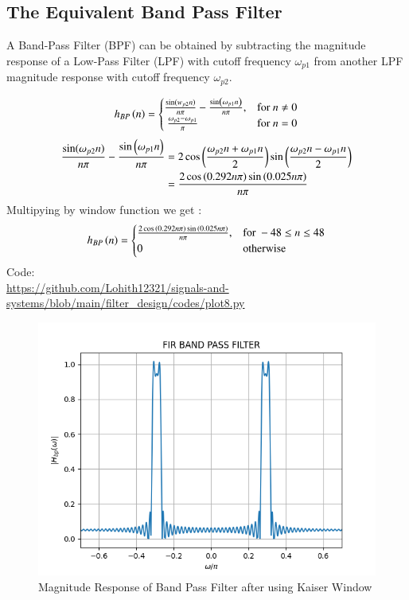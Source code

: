 \documentclass{article}
\begin{document}
\subsection{The Equivalent Band Pass Filter}
A Band-Pass Filter (BPF) can be obtained by subtracting the magnitude response of a Low-Pass Filter (LPF) with cutoff frequency $\omega_{p1}$ from another LPF magnitude response with cutoff frequency $\omega_{p2}$.

\begin{align}
    h_{BP}\left(n\right) = 
\begin{cases} 
    \frac{\sin(w_{p2} n)}{n\pi} -\frac{\sin\left(\omega_{p1}n\right)}{n\pi},  & \text{for } n\neq 0\\\
    \frac{\omega_{p2}-\omega_{p1}}{\pi} &\text{for } n= 0
\end{cases} \label{eq:h(n)desired_for_LPF}
\end{align}
\begin{align}
     \frac{\sin(\omega_{p2} n)}{n\pi} -\frac{\sin\left(\omega_{p1}n\right)}{n\pi} &= 2\cos{\ensuremath{\left(\frac{\omega_{p2}n+\omega_{p1}n}{2}\right)}}\sin{\ensuremath{\left(\frac{\omega_{p2}n-\omega_{p1}n}{2}\right)}}\\
            &= \frac{2\cos{\ensuremath{\left(0.292n\pi\right)}}\sin{\ensuremath{\left(0.025n\pi\right)}}}{n\pi}
\end{align}
Multipying by window function we get :
\begin{align}
    h_{BP}\left(n\right) = 
\begin{cases} 
   \frac{2\cos{\ensuremath{\left(0.292n\pi\right)}}\sin{\ensuremath{\left(0.025n\pi\right)}}}{n\pi},  & \text{for } -48\leq n \leq 48 \\
    0 &\text{otherwise}
\end{cases} \label{eq:h_BP(n)desired_for_LPF}
\end{align}
Code:\\
\href{https://github.com/Lohith12321/signals-and-systems/blob/main/filter_design/codes/plot8.py}{https://github.com/Lohith12321/signals-and-systems/blob/main/filter_design/codes/plot8.py}
\begin{figure}[H]
\centering
\includegraphics[width=1\columnwidth]{figs/plot8.png}
\caption{Magnitude Response of Band Pass Filter after using Kaiser Window}
\label{fig:Kaiser_BPF_response}
\end{figure}
\end{document}
